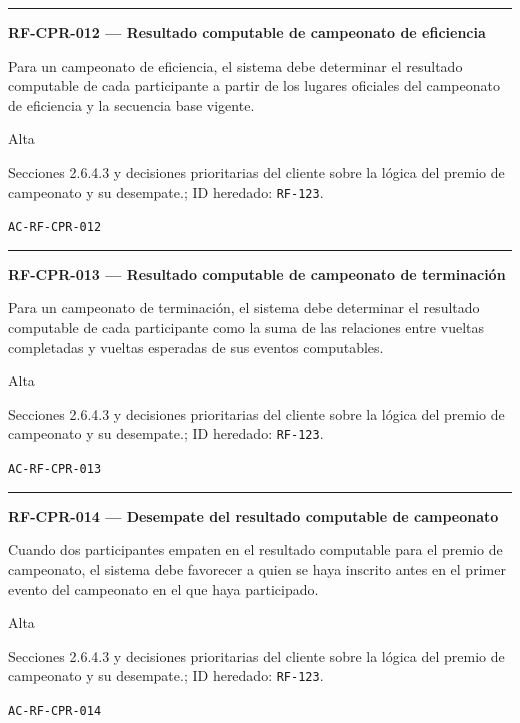\documentclass[10pt,letterpaper]{article}
\begin{document}
\vspace{0.25em}\hrule\vspace{0.65em}
\noindent\textbf{RF-CPR-012 --- Resultado computable de campeonato de eficiencia}\par
\begin{description}[style=nextline,leftmargin=3.15cm,labelwidth=2.8cm,font=\normalfont\bfseries]
\item[Obligación] Para un campeonato de eficiencia, el sistema debe determinar el resultado computable de cada participante a partir de los lugares oficiales del campeonato de eficiencia y la secuencia base vigente.
\item[Prioridad] Alta
\item[Procedencia] Secciones 2.6.4.3 y decisiones prioritarias del cliente sobre la lógica del premio de campeonato y su desempate.; ID heredado: \texttt{RF-123}.
\item[Verificación] \texttt{AC-RF-CPR-012}
\end{description}
\vspace{0.25em}\hrule\vspace{0.65em}
\noindent\textbf{RF-CPR-013 --- Resultado computable de campeonato de terminación}\par
\begin{description}[style=nextline,leftmargin=3.15cm,labelwidth=2.8cm,font=\normalfont\bfseries]
\item[Obligación] Para un campeonato de terminación, el sistema debe determinar el resultado computable de cada participante como la suma de las relaciones entre vueltas completadas y vueltas esperadas de sus eventos computables.
\item[Prioridad] Alta
\item[Procedencia] Secciones 2.6.4.3 y decisiones prioritarias del cliente sobre la lógica del premio de campeonato y su desempate.; ID heredado: \texttt{RF-123}.
\item[Verificación] \texttt{AC-RF-CPR-013}
\end{description}
\vspace{0.25em}\hrule\vspace{0.65em}
\noindent\textbf{RF-CPR-014 --- Desempate del resultado computable de campeonato}\par
\begin{description}[style=nextline,leftmargin=3.15cm,labelwidth=2.8cm,font=\normalfont\bfseries]
\item[Obligación] Cuando dos participantes empaten en el resultado computable para el premio de campeonato, el sistema debe favorecer a quien se haya inscrito antes en el primer evento del campeonato en el que haya participado.
\item[Prioridad] Alta
\item[Procedencia] Secciones 2.6.4.3 y decisiones prioritarias del cliente sobre la lógica del premio de campeonato y su desempate.; ID heredado: \texttt{RF-123}.
\item[Verificación] \texttt{AC-RF-CPR-014}
\end{description}
\end{document}
